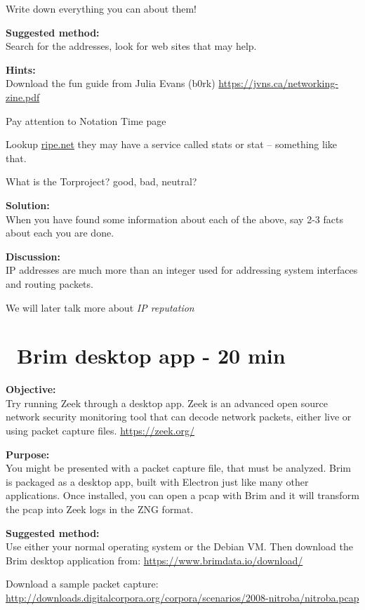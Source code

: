 \documentclass[a4paper,11pt,notitlepage]{report}
\begin{document}
Write down everything you can about them!

{\bf Suggested method:}\\
Search for the addresses, look for web sites that may help.

{\bf Hints:}\\
Download the fun guide from Julia Evans (b0rk) \url{https://jvns.ca/networking-zine.pdf}

Pay attention to Notation Time page

Lookup \url{ripe.net} they may have a service called stats or stat -- something like that.

What is the Torproject? good, bad, neutral?

{\bf Solution:}\\
When you have found some information about each of the above, say 2-3 facts about each you are done.

{\bf Discussion:}\\
IP addresses are much more than an integer used for addressing system interfaces and routing packets.

We will later talk more about \emph{IP reputation}


\chapter{\faExclamationTriangle\ Brim desktop app -  20 min}
\label{ex:brim-security}


{\bf Objective:}\\
Try running Zeek through a desktop app. Zeek is an advanced open source network security monitoring tool that can decode network packets, either live or using packet capture files. \url{https://zeek.org/}

{\bf Purpose:}\\
You might be presented with a packet capture file, that must be analyzed. Brim is packaged as a desktop app, built with Electron just like many other applications. Once installed, you can open a pcap with Brim and it will transform the pcap into Zeek logs in the ZNG format.

{\bf Suggested method:}\\
Use either your normal operating system or the Debian VM. Then download the Brim desktop application from:
\url{https://www.brimdata.io/download/}

Download a sample packet capture:\\
\url{http://downloads.digitalcorpora.org/corpora/scenarios/2008-nitroba/nitroba.pcap}
\end{document}
